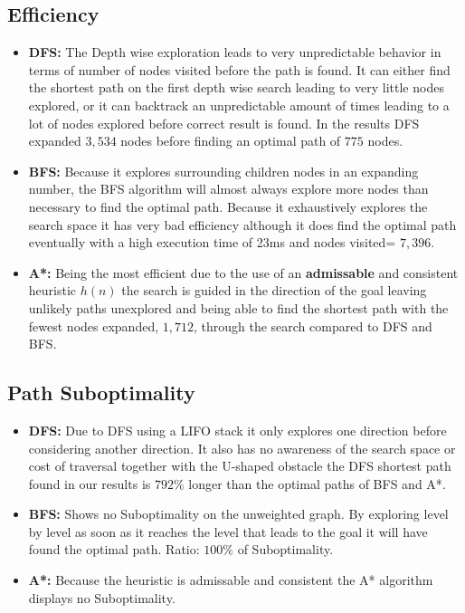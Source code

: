 \documentclass[12pt,a4paper]{article}
\begin{document}
\subsection{Efficiency}
\begin{itemize}
    \item \textbf{DFS:} The Depth wise exploration leads to very unpredictable behavior in terms of number of nodes visited before the path is found.
    It can either find the shortest path on the first depth wise search leading to very little nodes explored, or it can backtrack an unpredictable
    amount of times leading to a lot of nodes explored before correct result is found. In the results DFS expanded $3{,}534$ nodes before finding an optimal
    path of $775$ nodes.

    \item \textbf{BFS:} Because it explores surrounding children nodes in an expanding number, the BFS algorithm will almost always explore more nodes than 
    necessary to find the optimal path. Because it exhaustively explores the search space it has very bad efficiency although it does find the optimal path 
    eventually with a high execution time of 23ms and nodes visited= $7,396$.
    
    \item \textbf{A*:} Being the most efficient due to the use of an \textbf{admissable} and consistent heuristic $h(n)$ the search is guided in the direction of the goal
    leaving unlikely paths unexplored and being able to find the shortest path with the fewest nodes expanded, $1,712$, through the search compared to DFS and BFS.
\end{itemize}

\subsection{Path Suboptimality}
\begin{itemize}
    \item \textbf{DFS:} Due to DFS using a LIFO stack it only explores one direction before considering another direction. It also has no awareness of the search space or cost 
    of traversal together with the U-shaped obstacle the DFS shortest path found in our results is $792\%$ longer than the optimal paths of BFS and A*.

    \item \textbf{BFS:} Shows no Suboptimality on the unweighted graph. By exploring level by level as soon as it reaches the level that leads to the goal it will have 
    found the optimal path. Ratio: $100\%$ of Suboptimality.
    
    \item \textbf{A*:} Because the heuristic is admissable and consistent the A* algorithm displays no Suboptimality.
\end{itemize}
\end{document}
